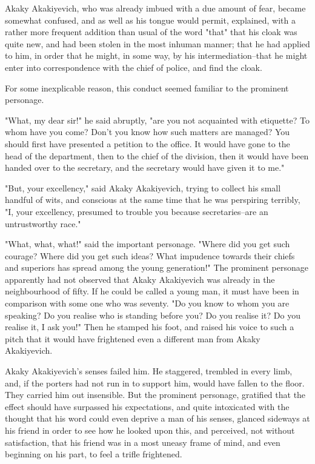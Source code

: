 Akaky Akakiyevich, who was already imbued with a due amount of fear,
became somewhat confused, and as well as his tongue would permit,
explained, with a rather more frequent addition than usual of the word
"that" that his cloak was quite new, and had been stolen in the most
inhuman manner; that he had applied to him, in order that he might, in
some way, by his intermediation--that he might enter into
correspondence with the chief of police, and find the cloak.

For some inexplicable reason, this conduct seemed familiar to the
prominent personage.

"What, my dear sir!" he said abruptly, "are you not acquainted with
etiquette? To whom have you come? Don't you know how such matters are
managed? You should first have presented a petition to the office. It
would have gone to the head of the department, then to the chief of
the division, then it would have been handed over to the secretary,
and the secretary would have given it to me."

"But, your excellency," said Akaky Akakiyevich, trying to collect his
small handful of wits, and conscious at the same time that he was
perspiring terribly, "I, your excellency, presumed to trouble you
because secretaries--are an untrustworthy race."

"What, what, what!" said the important personage. "Where did you get
such courage? Where did you get such ideas? What impudence towards
their chiefs and superiors has spread among the young generation!" The
prominent personage apparently had not observed that Akaky Akakiyevich
was already in the neighbourhood of fifty. If he could be called a
young man, it must have been in comparison with some one who was
seventy. "Do you know to whom you are speaking? Do you realise who is
standing before you? Do you realise it? Do you realise it, I ask you!"
Then he stamped his foot, and raised his voice to such a pitch that it
would have frightened even a different man from Akaky Akakiyevich.

Akaky Akakiyevich's senses failed him. He staggered, trembled in every
limb, and, if the porters had not run in to support him, would have
fallen to the floor. They carried him out insensible. But the
prominent personage, gratified that the effect should have surpassed
his expectations, and quite intoxicated with the thought that his word
could even deprive a man of his senses, glanced sideways at his friend
in order to see how he looked upon this, and perceived, not without
satisfaction, that his friend was in a most uneasy frame of mind, and
even beginning on his part, to feel a trifle frightened.

